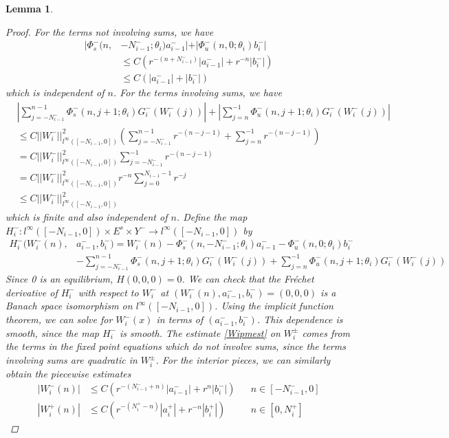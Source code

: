 \documentclass[12pt]{article}
\newtheorem{lemma}{Lemma}
\begin{document}
\begin{lemma}
\begin{proof}
For the terms not involving sums, we have
\begin{align*}
|\Phi_s^-(n, &-N_{i-1}^-; \theta_i) a_{i-1}^-| + |\Phi_u^-(n, 0; \theta_i) b_i^-| \\
&\leq C ( r^{-(n + N_{i-1}^-)} |a_{i-1}^-| +  r^{-n}|b_i^-|) \\
&\leq C ( |a_{i-1}^-| + |b_i^-|) 
\end{align*}
which is independent of $n$. For the terms involving sums, we have
\begin{align*}
&\left| \sum_{j = -N_{i-1}^-}^{n-1} \Phi_s^-(n, j+1; \theta_i) G_i^-(W_i^-(j))\right| + \left|\sum_{j = n}^{-1} \Phi_u^-(n, j+1; \theta_i) G_i^-(W_i^-(j))\right| \\
&\leq C ||W_i^-||_{l^\infty([-N_{i-1}, 0])}^2 \left( \sum_{j = -N_{i-1}^-}^{n-1} r^{-(n - j - 1)} + \sum_{j = n}^{-1} r^{-(n - j - 1)} \right) \\
&= C ||W_i^-||_{l^\infty([-N_{i-1}, 0])}^2 \sum_{j = -N_{i-1}^-}^{-1} r^{-(n - j - 1)} \\
&= C ||W_i^-||_{l^\infty([-N_{i-1}, 0])}^2 r^{-n} \sum_{j = 0}^{N_{i-1} - 1} r^{-j} \\
&\leq C ||W_i^-||_{l^\infty([-N_{i-1}, 0])}^2 
\end{align*}
which is finite and also independent of $n$. Define the map $H_i^-: l^\infty([-N_{i-1}, 0]) \times E^s \times Y^- \rightarrow l^\infty([-N_{i-1}, 0])$ by
\begin{align*}
H_i^-(W_i^-(n), &a_{i-1}^-, b_i^-) = W_i^-(n) - \Phi_s^-(n, -N_{i-1}^-; \theta_i) a_{i-1}^- - \Phi_u^-(n, 0; \theta_i) b_i^-  \\
&- \sum_{j = -N_{i-1}^-}^{n-1} \Phi_s^-(n, j+1; \theta_i) G_i^-(W_i^-(j)) + \sum_{j = n}^{-1} \Phi_u^-(n, j+1; \theta_i) G_i^-(W_i^-(j)) 
\end{align*}
Since 0 is an equilibrium, $H(0, 0, 0) = 0$. We can check that the Fr\'echet derivative of $H_i^-$ with respect to $W_i^-$ at $(W_i^-(n), a_{i-1}^-, b_i^-) = (0, 0, 0)$ is a Banach space isomorphism on $l^\infty([-N_{i-1}, 0])$. Using the implicit function theorem, we can solve for $W_i^-(x)$ in terms of $(a_{i-1}^-, b_i^-)$. This dependence is smooth, since the map $H_i^-$ is smooth. The estimate \eqref{Wipmest} on $W_i^\pm$ comes from the terms in the fixed point equations which do not involve sums, since the terms involving sums are quadratic in $W_i^\pm$. For the interior pieces, we can similarly obtain the piecewise estimates
\begin{align*}
|W_i^-(n)| &\leq C (r^{-(N_{i-1}^- + n)}|a_{i-1}^-| + r^n|b_i^-|) && n \in [-N_{i-1}^-, 0] \\
|W_i^+(n)| &\leq C (r^{-(N_i^+ - n)}|a_i^+| + r^{-n}|b_i^+| ) && n \in [0, N_i^+] 
\end{align*}
\end{proof}
\end{lemma}
\end{document}
